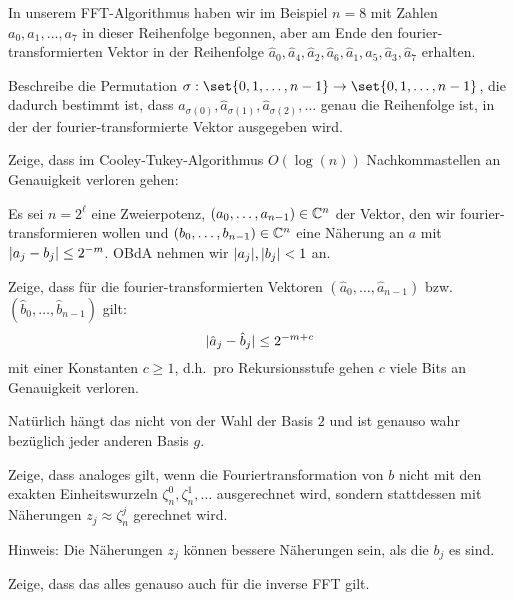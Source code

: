 
\begin{sheet}
    \begin{problem}[title={Eine interessante Permutation}]
        In unserem FFT-Algorithmus haben wir im Beispiel $n=8$ mit Zahlen $a_0,a_1,\ldots,a_7$ in dieser Reihenfolge begonnen, aber am Ende den fourier-transformierten Vektor in der Reihenfolge $\hat{a}_0, \hat{a}_4, \hat{a}_2, \hat{a}_6, \hat{a}_1,\hat{a}_5, \hat{a}_3, \hat{a}_7$ erhalten.

        Beschreibe die Permutation $\sigma:\set{0,1,\ldots,n-1} \to \set{0,1,\ldots,n-1}$, die dadurch bestimmt ist, dass $\hat{a}_{\sigma(0)}, \hat{a}_{\sigma(1)}, \hat{a}_{\sigma(2)}, \ldots$ genau die Reihenfolge ist, in der der fourier-transformierte Vektor ausgegeben wird.
    \end{problem}

    \begin{problem}[title={FFT ist numerisch stabil}]
        Zeige, dass im Cooley-Tukey-Algorithmus $O(\log(n))$ Nachkommastellen an Genauigkeit verloren gehen:

        Es sei $n=2^\ell$ eine Zweierpotenz, $(a_0,\ldots,a_{n-1})\in\mathbb{C}^n$ der Vektor, den wir fourier-transformieren wollen und $(b_0, \ldots, b_{n-1})\in\mathbb{C}^n$ eine Näherung an $a$ mit $\lvert a_j-b_j\rvert\leq 2^{-m}$. OBdA nehmen wir $\lvert a_j\rvert, \lvert b_j\rvert < 1$ an.

        \begin{subproblem}
            Zeige, dass für die fourier-transformierten Vektoren $(\hat{a}_0,\ldots,\hat{a}_{n-1})$ bzw. $(\hat{b}_0,\ldots,\hat{b}_{n-1})$ gilt:
            \[\lvert\hat{a}_j - \hat{b}_j\rvert \leq 2^{-m+c}\]
            mit einer Konstanten $c\geq 1$, d.h.\ pro Rekursionsstufe gehen $c$ viele Bits an Genauigkeit verloren.
        \end{subproblem}
        \begin{subproblem}
            Natürlich hängt das nicht von der Wahl der Basis $2$ und ist genauso wahr bezüglich jeder anderen Basis $g$.
        \end{subproblem}
        \begin{subproblem}
            Zeige, dass analoges gilt, wenn die Fouriertransformation von $b$ nicht mit den exakten Einheitswurzeln $\zeta_n^0,\zeta_n^1,\ldots$ ausgerechnet wird, sondern stattdessen mit Näherungen $z_j \approx \zeta_n^j$ gerechnet wird.

            Hinweis: Die Näherungen $z_j$ können bessere Näherungen sein, als die $b_j$ es sind.
        \end{subproblem}
        \begin{subproblem}
            Zeige, dass das alles genauso auch für die inverse FFT gilt.
        \end{subproblem}
    \end{problem}


\end{sheet}
